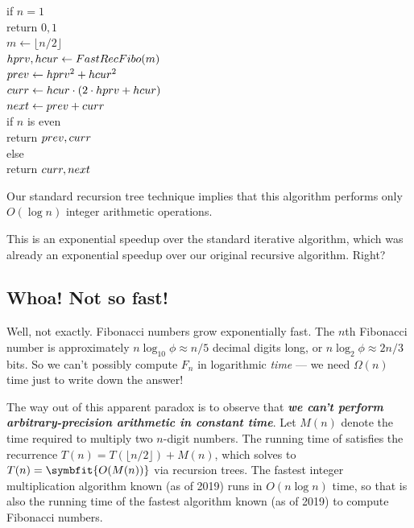 \begin{pseudocode}
\\
\\
if $n = 1$\\
\Indent return $0, 1$\\
$m \gets \lfloor n/2 \rfloor$\\
$hprv, hcur \gets FastRecFibo(m)$ \\
$prev \gets hprv^2 + hcur^2$ \\
$curr \gets hcur \cdot (2 \cdot hprv + hcur)$ \\
$next \gets prev + curr$ \\
if $n$ is even\\
\Indent return $prev, curr$\\
else\\
\Indent return $curr, next$
\end{pseudocode}

Our standard recursion tree technique implies that this algorithm performs only $O(\log n)$ integer arithmetic operations.

This is an exponential speedup over the standard iterative algorithm, which was already an exponential speedup over our original recursive algorithm.
Right?

\subsection{Whoa! Not so fast!}

Well, not exactly.
Fibonacci numbers grow exponentially fast.
The $n$th Fibonacci number is approximately $n \log_{10} \phi \approx n/5$ decimal digits long, or $n \log_2 \phi \approx 2n/3$ bits.
So we can’t possibly compute $F_n$ in logarithmic \textit{time} --- we need $\Omega(n)$ time just to write down the answer!

The way out of this apparent paradox is to observe that \textbf{\textit{we can’t perform arbitrary-precision arithmetic in constant time}}.
Let $M(n)$ denote the time required to multiply two $n$-digit numbers.
The running time of  satisfies the recurrence $T(n) = T(\lfloor n/2 \rfloor) + M(n)$, which solves to $T(n) = \symbfit{O(M(n))}$ via recursion trees.
The fastest integer multiplication algorithm known (as of 2019) runs in $O(n \log n)$ time, so that is also the running time of the fastest algorithm known (as of 2019) to compute Fibonacci numbers.


